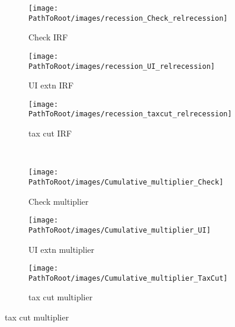 \documentclass[\PathToRoot/\ProjectName]{subfiles}
\begin{document}
\vspace{1em}
\FloatBarrier 

\begin{figure}[H] 
  \centering
  \caption{Policy effectiveness during recessions with aggregate demand effects}
  \whenintegrated{\label{fig:Policyrelrecession}} 
  \noindent\begin{minipage}{\textwidth}
    \centering
    \begin{subfigure}[b]{.32\linewidth}
      \centering
      \texttt{[image: \\PathToRoot/images/recession\_Check\_relrecession]}
      \caption{Check IRF}
      \whenintegrated{\label{fig:recessioncheckrelrecession}} 
    \end{subfigure}
    \hfill%
    \begin{subfigure}[b]{.32\linewidth}
      \centering
      \texttt{[image: \\PathToRoot/images/recession\_UI\_relrecession]}
      \caption{UI extn IRF}
      \whenintegrated{\label{fig:recessionuirelrecession}} 
    \end{subfigure}
    \hfill%
    \begin{subfigure}[b]{.32\linewidth}
      \centering
      \texttt{[image: \\PathToRoot/images/recession\_taxcut\_relrecession]}
      \caption{tax cut IRF}
      \whenintegrated{\label{fig:recessiontaxcutrelrecession}} 
    \end{subfigure}
    \\[1.5em]
    \begin{subfigure}[b]{.32\linewidth}
      \centering
      \texttt{[image: \\PathToRoot/images/Cumulative\_multiplier\_Check]}
      \caption{Check multiplier}
      \whenintegrated{\label{fig:recessioncheckrelrecession_Mult}} 
    \end{subfigure}
    \hfill%
    \begin{subfigure}[b]{.32\linewidth}
      \centering
      \texttt{[image: \\PathToRoot/images/Cumulative\_multiplier\_UI]}
      \caption{UI extn multiplier}
      \whenintegrated{\label{fig:recessionuirelrecession_Mult}} 
    \end{subfigure}
    \hfill%
    \begin{subfigure}[b]{.32\linewidth}
      \centering
      \texttt{[image: \\PathToRoot/images/Cumulative\_multiplier\_TaxCut]}
      \caption{tax cut multiplier}
      \whenintegrated{\label{fig:recessiontaxcutrelrecession_Mult}} 
    \end{subfigure}
  \end{minipage}
\end{figure}
\end{document}
